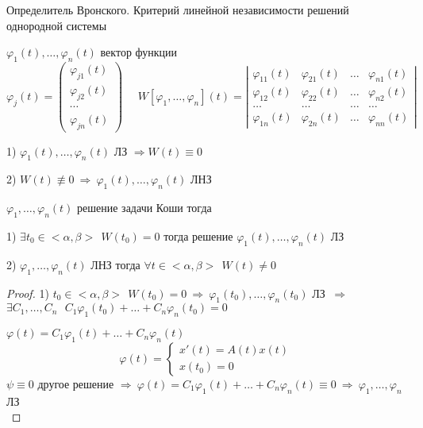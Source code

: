 \begin{title}[\Large]
  Определитель Вронского. Критерий линейной независимости решений однородной
  системы
\end{title}

\begin{define}
  $\varphi_1(t), \ldots, \varphi_n(t)$ вектор функции
  $$
  \varphi_j(t) =
  \left(
  \begin{array}{c}
    \varphi_{j1}(t) \\
    \varphi_{j2}(t) \\
    \cdots \\
    \varphi_{jn}(t)
  \end{array}
  \right) ~~~~~~
  W[\varphi_1, \ldots, \varphi_n](t) =
  \left|
  \begin{array}{cccc}
    \varphi_{11}(t) & \varphi_{21}(t) & \ldots & \varphi_{n1}(t) \\
    \varphi_{12}(t) & \varphi_{22}(t) & \ldots & \varphi_{n2}(t) \\
    \ldots & \ldots & \ldots & \ldots \\
    \varphi_{1n}(t) & \varphi_{2n}(t) & \ldots & \varphi_{nn}(t)
  \end{array}
  \right|
  $$
\end{define}

\begin{block}[Утверждения]
  1) $\varphi_1(t), \ldots, \varphi_n(t)$ ЛЗ $\Rightarrow W(t) \equiv 0$

  2) $W(t) \not\equiv 0 ~ \Rightarrow ~ \varphi_1(t), \ldots, \varphi_n(t)$ ЛНЗ
\end{block}

\begin{block}
  $\varphi_1, \ldots, \varphi_n(t)$ решение задачи Коши тогда

  1) $\exists t_0 \in <\alpha, \beta> ~~ W(t_0) = 0$ тогда решение
  $\varphi_1(t), \ldots, \varphi_n(t)$ ЛЗ

  2) $\varphi_1, \ldots, \varphi_n(t)$ ЛНЗ тогда $\forall t \in <\alpha, \beta>
  ~~ W(t) \not= 0$
\end{block}

\begin{proof}
  1) $t_0 \in <\alpha, \beta> ~~ W(t_0) = 0 ~ \Rightarrow ~ \varphi_1(t_0),
  \ldots, \varphi_n(t_0)$ ЛЗ $~\Rightarrow~$ $\exists C_1, \ldots, C_n ~~~
  C_1 \varphi_1(t_0) + \ldots + C_n \varphi_n (t_0) = 0$

  $\varphi(t) = C_1\varphi_1(t) + \ldots + C_n \varphi_n(t)$
  $$
  \varphi(t) =
  \left\{
  \begin{array}{l}
    x'(t) = A(t)x(t) \\
    x(t_0) = 0
  \end{array}
  \right.
  $$
  $\psi \equiv 0$ другое решение $\Rightarrow ~ \varphi(t) = C_1 \varphi_1(t) +
  \ldots + C_n \varphi_n(t) \equiv 0 ~ \Rightarrow ~ \varphi_1, \ldots,
  \varphi_n$ ЛЗ \\
\end{proof}

